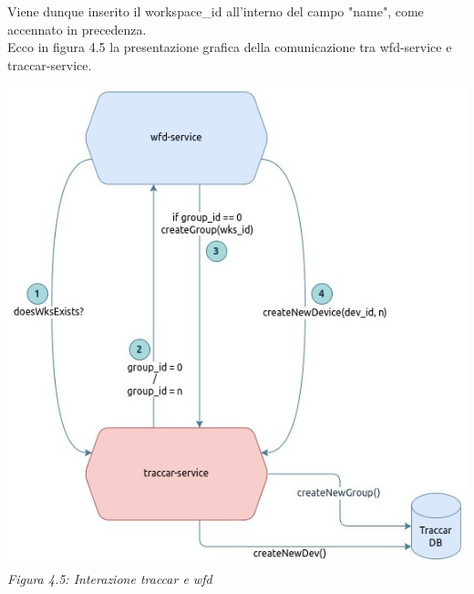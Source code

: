 \documentclass[a4paper,titlepage,12pt]{book}
\begin{document}
{\noindent Viene dunque inserito il workspace\_id all'interno del campo "name", come accennato in precedenza.\\
Ecco in figura 4.5 la presentazione grafica della comunicazione tra wfd-service e traccar-service. 
\newpage
\begin{center}
\includegraphics[scale=0.5]{images/wfd_traccar.jpg}\\ 
\textit{Figura 4.5: Interazione traccar e wfd}
\end{center}


}
\end{document}
